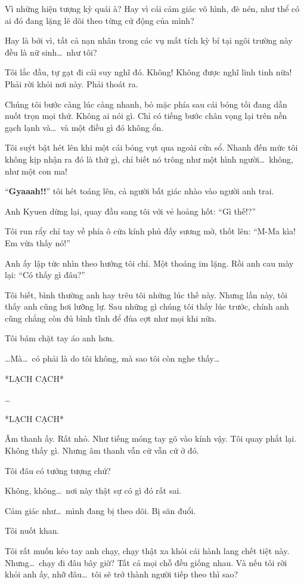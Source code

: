 \documentclass[../main.tex]{subfiles}
\begin{document}
Vì những hiện tượng kỳ quái à? Hay vì cái cảm giác vô hình, đè nén, như thể có ai đó đang lặng lẽ dõi theo từng cử động của mình?

Hay là bởi vì, tất cả nạn nhân trong các vụ mất tích kỳ bí tại ngôi trường này đều là nữ sinh\dots\ như tôi?

Tôi lắc đầu, tự gạt đi cái suy nghĩ đó. Không! Không được nghĩ linh tinh nữa! Phải rời khỏi nơi này. Phải thoát ra.

Chúng tôi bước càng lúc càng nhanh, bỏ mặc phía sau cái bóng tối đang dần nuốt trọn mọi thứ. Không ai nói gì. Chỉ có tiếng bước chân vọng lại trên nền gạch lạnh và\dots\ và một điều gì đó không ổn.

Tôi suýt bật hét lên khi một cái bóng vụt qua ngoài cửa sổ. Nhanh đến mức tôi không kịp nhận ra đó là thứ gì, chỉ biết nó trông như một hình người\dots\ không, như một con ma!

``\textbf{Gyaaah!!}'' tôi hét toáng lên, cả người bất giác nhào vào người anh trai.

Anh Kyuen dừng lại, quay đầu sang tôi với vẻ hoảng hốt: ``Gì thế!?''

Tôi run rẩy chỉ tay về phía ô cửa kính phủ đầy sương mờ, thốt lên: ``M-Ma kìa! Em vừa thấy nó!''

Anh ấy lập tức nhìn theo hướng tôi chỉ. Một thoáng im lặng. Rồi anh cau mày lại: ``Có thấy gì đâu?''

Tôi biết, bình thường anh hay trêu tôi những lúc thế này. Nhưng lần này, tôi thấy anh cũng hơi lưỡng lự. Sau những gì chúng tôi thấy lúc trước, chính anh cũng chẳng còn đủ bình tĩnh để đùa cợt như mọi khi nữa.

Tôi bám chặt tay áo anh hơn.

\dots Mà\dots\ có phải là do tôi không, mà sao tôi còn nghe thấy\dots

*LẠCH CẠCH*

\dots

*LẠCH CẠCH*

Âm thanh ấy. Rất nhỏ. Như tiếng móng tay gõ vào kính vậy. Tôi quay phắt lại. Không thấy gì. Nhưng âm thanh vẫn cứ vẫn cứ ở đó.

Tôi đâu có tưởng tượng chứ?

Không, không\dots\ nơi này thật sự có gì đó rất sai.

Cảm giác như\dots\ mình đang bị theo dõi. Bị săn đuổi.

Tôi nuốt khan.

Tôi rất muốn kéo tay anh chạy, chạy thật xa khỏi cái hành lang chết tiệt này. Nhưng\dots\ chạy đi đâu bây giờ? Tất cả mọi chỗ đều giống nhau. Và nếu tôi rời khỏi anh ấy, nhỡ đâu\dots\ tôi sẽ trở thành người tiếp theo thì sao?
\end{document}
